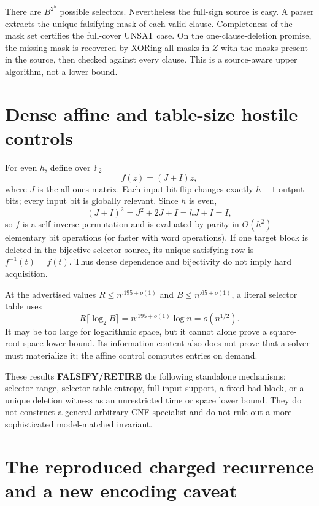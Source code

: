 \documentclass[11pt]{article}
\begin{document}
There are $B^{2^h}$ possible selectors.  Nevertheless the full-sign source is easy.  A parser extracts the unique falsifying mask of each valid clause.  Completeness of the mask set certifies the full-cover UNSAT case.  On the one-clause-deletion promise, the missing mask is recovered by XORing all masks in $Z$ with the masks present in the source, then checked against every clause.  This is a source-aware upper algorithm, not a lower bound.

\section{Dense affine and table-size hostile controls}

For even $h$, define over $\mathbb F_2$
\[
 f(z)=(J+I)z,
\]
where $J$ is the all-ones matrix.  Each input-bit flip changes exactly $h-1$ output bits; every input bit is globally relevant.  Since $h$ is even,
\[
 (J+I)^2=J^2+2J+I=hJ+I=I,
\]
so $f$ is a self-inverse permutation and is evaluated by parity in $O(h^2)$ elementary bit operations (or faster with word operations).  If one target block is deleted in the bijective selector source, its unique satisfying row is $f^{-1}(t)=f(t)$.  Thus dense dependence and bijectivity do not imply hard acquisition.

At the advertised values $R\le n^{.195+o(1)}$ and $B\le n^{.65+o(1)}$, a literal selector table uses
\[
 R\lceil\log_2 B\rceil=n^{.195+o(1)}\log n=o(n^{1/2}).
\]
It may be too large for logarithmic space, but it cannot alone prove a square-root-space lower bound.  Its information content also does not prove that a solver must materialize it; the affine control computes entries on demand.

These results \textbf{FALSIFY/RETIRE} the following standalone mechanisms: selector range, selector-table entropy, full input support, a fixed bad block, or a unique deletion witness as an unrestricted time or space lower bound.  They do not construct a general arbitrary-CNF specialist and do not rule out a more sophisticated model-matched invariant.

\section{The reproduced charged recurrence and a new encoding caveat}
\end{document}

